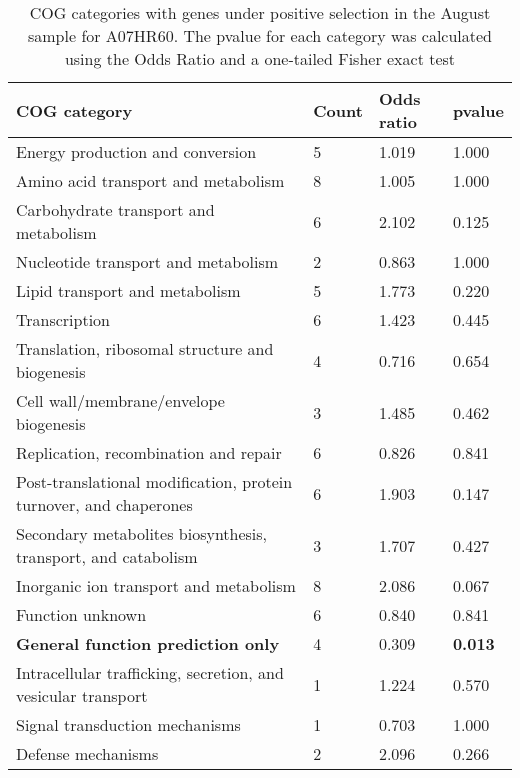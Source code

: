 \begin{table}[hb]
\footnotesize 
	\tabcolsep=0.11cm 
\caption{COG categories with genes under positive selection in the August sample for A07HR60. The pvalue for each category was calculated using the Odds Ratio and a one-tailed Fisher exact test \\} 
\begin{tabularx}{\textwidth}{L{6cm}R{2cm}R{2cm}R{2cm}} 
\hline 
\textbf{COG category} & \textbf{Count} & \textbf{Odds ratio} & \textbf{pvalue} \\ 
\hline 
Energy production and conversion & 5 & 1.019 & 1.000 \\ 
Amino acid transport and metabolism & 8 & 1.005 & 1.000 \\ 
Carbohydrate transport and metabolism & 6 & 2.102 & 0.125 \\ 
Nucleotide transport and metabolism & 2 & 0.863 & 1.000 \\ 
Lipid transport and metabolism & 5 & 1.773 & 0.220 \\ 
Transcription & 6 & 1.423 & 0.445 \\ 
Translation, ribosomal structure and biogenesis & 4 & 0.716 & 0.654 \\ 
Cell wall/membrane/envelope biogenesis & 3 & 1.485 & 0.462 \\ 
Replication, recombination and repair & 6 & 0.826 & 0.841 \\ 
Post-translational modification, protein turnover, and chaperones & 6 & 1.903 & 0.147 \\ 
Secondary metabolites biosynthesis, transport, and catabolism & 3 & 1.707 & 0.427 \\ 
Inorganic ion transport and metabolism & 8 & 2.086 & 0.067 \\ 
Function unknown & 6 & 0.840 & 0.841 \\ 
\textbf{General function prediction only} & 4 & 0.309 & \textbf{0.013} \\ 
Intracellular trafficking, secretion, and vesicular transport & 1 & 1.224 & 0.570 \\ 
Signal transduction mechanisms & 1 & 0.703 & 1.000 \\ 
Defense mechanisms & 2 & 2.096 & 0.266 \\ 
\end{tabularx} 
\label{August_COG_Selection_A07HR60} 
 \end{table} 


